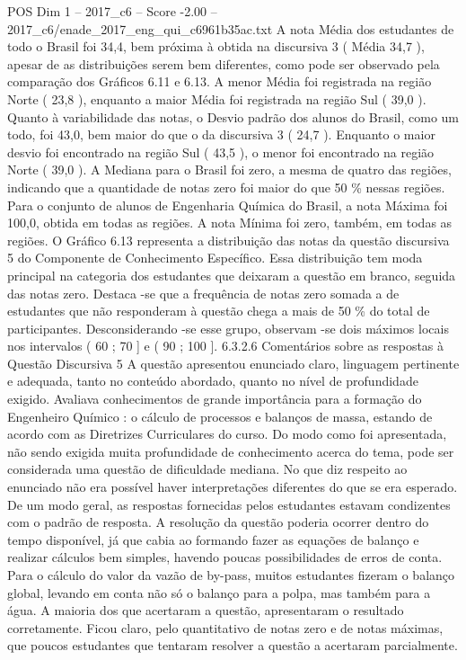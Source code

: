 \begin{textsample}{POS Dim 1 – 2017\_c6 – Score -2.00 – 2017\_c6/enade\_2017\_eng\_qui\_c6961b35ac.txt}
A nota Média dos estudantes de todo o Brasil foi 34,4, bem próxima à obtida na discursiva 3 ( Média 34,7 ), apesar de as distribuições serem bem diferentes, como pode ser observado pela comparação dos Gráficos 6.11 e 6.13.
A menor Média foi registrada na região Norte ( 23,8 ), enquanto a maior Média foi registrada na região Sul ( 39,0 ).
Quanto à variabilidade das notas, o Desvio padrão dos alunos do Brasil, como um todo, foi 43,0, bem maior do que o da discursiva 3 ( 24,7 ).
Enquanto o maior desvio foi encontrado na região Sul ( 43,5 ), o menor foi encontrado na região Norte ( 39,0 ).
A Mediana para o Brasil foi zero, a mesma de quatro das regiões, indicando que a quantidade de notas zero foi maior do que 50 \% nessas regiões.
Para o conjunto de alunos de Engenharia Química do Brasil, a nota Máxima foi 100,0, obtida em todas as regiões.
A nota Mínima foi zero, também, em todas as regiões.
O Gráfico 6.13 representa a distribuição das notas da questão discursiva 5 do Componente de Conhecimento Específico.
Essa distribuição tem moda principal na categoria dos estudantes que deixaram a questão em branco, seguida das notas zero.
Destaca -se que a frequência de notas zero somada a de estudantes que não responderam à questão chega a mais de 50 \% do total de participantes.
Desconsiderando -se esse grupo, observam -se dois máximos locais nos intervalos ( 60 ; 70 ] e ( 90 ; 100 ]. 6.3.2.6 Comentários sobre as respostas à Questão Discursiva 5 A questão apresentou enunciado claro, linguagem pertinente e adequada, tanto no conteúdo abordado, quanto no nível de profundidade exigido.
Avaliava conhecimentos de grande importância para a formação do Engenheiro Químico : o cálculo de processos e balanços de massa, estando de acordo com as Diretrizes Curriculares do curso.
Do modo como foi apresentada, não sendo exigida muita profundidade de conhecimento acerca do tema, pode ser considerada uma questão de dificuldade mediana.
No que diz respeito ao enunciado não era possível haver interpretações diferentes do que se era esperado.
De um modo geral, as respostas fornecidas pelos estudantes estavam condizentes com o padrão de resposta.
A resolução da questão poderia ocorrer dentro do tempo disponível, já que cabia ao formando fazer as equações de balanço e realizar cálculos bem simples, havendo poucas possibilidades de erros de conta.
Para o cálculo do valor da vazão de by-pass, muitos estudantes fizeram o balanço global, levando em conta não só o balanço para a polpa, mas também para a água.
A maioria dos que acertaram a questão, apresentaram o resultado corretamente.
Ficou claro, pelo quantitativo de notas zero e de notas máximas, que poucos estudantes que tentaram resolver a questão a acertaram parcialmente.

\end{textsample}
